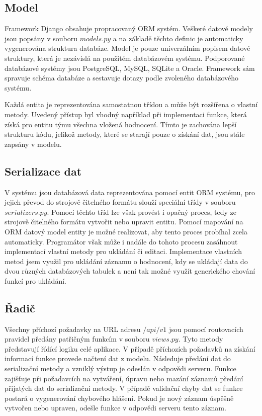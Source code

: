 \documentclass[
  digital,
  twoside,
  table, 
  nolof, 
  nolot
]{fithesis3}
\begin{document}
\subsection{Model}
\label{model}
Framework Django obsahuje propracovaný ORM systém. Veškeré datové modely jsou popsány v souboru $models.py$ a na základě těchto definic je automaticky vygenerována struktura databáze. Model je pouze univerzálním popisem datové struktury, která je nezávislá na použitém databázovém systému. Podporované databázové systémy jsou PostgreSQL, MySQL, SQLite a Oracle. Framework sám spravuje schéma databáze a sestavuje dotazy podle zvoleného databázového systému.

Každá entita je reprezentována samostatnou třídou a může být rozšířena o vlastní metody. Uvedený přístup byl vhodný například při implementaci funkce, která získá pro entitu týmu všechna vložená hodnocení. Tímto je zachována lepší strukturu kódu, jelikož metody, které se starají pouze o získání dat, jsou stále zapsány v modelu.

\subsection{Serializace dat}
\label{serializer}
V systému jsou databázová data reprezentována pomocí entit ORM systému, pro jejich převod do strojově čitelného formátu slouží speciální třídy v souboru $serializers.py$. Pomocí těchto tříd lze však provést i opačný proces, tedy ze strojově čitelného formátu vytvořit nebo upravit entitu. Pomocí mapování na ORM datový model entity je možné realizovat, aby tento proces probíhal zcela automaticky. Programátor však může i nadále do tohoto procesu zasáhnout implementací vlastní metody pro ukládání či editaci. Implementace vlastních metod jsem využil pro ukládání záznamu o hodnocení, kdy se ukládají data do dvou různých databázových tabulek a není tak možné využít generického chování funkcí pro ukládání.

\subsection{Řadič}
\label{radic}
Všechny příchozí požadavky na URL adresu $/api/v1$ jsou pomocí routovacích pravidel předány patřičným funkcím v souboru $views.py$. Tyto metody představují řídící logiku celé aplikace. V případě příchozích požadavků na získání informací funkce provede načtení dat z modelu. Následuje předání dat do serializační metody a vzniklý výstup je odeslán v odpovědi serveru. Funkce zajišťuje při požadavcích na vytváření, úpravu nebo mazání záznamů předání přijatých dat do serializační metody. V případě validační chyby dat se funkce postará o vygenerování chybového hlášení. Pokud je nový záznam úspěšně vytvořen nebo upraven, odešle funkce v odpovědi serveru tento záznam.
\end{document}
